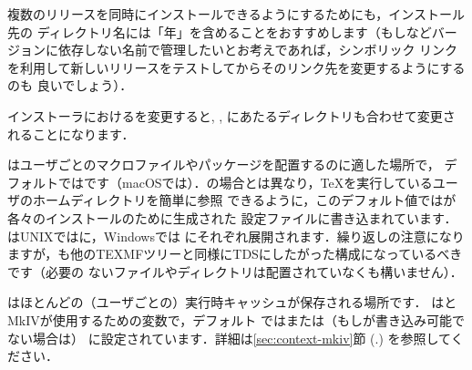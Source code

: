 \documentclass[uplatex,dvipdfmx]{jsarticle}
\begin{document}
複数の\TL リリースを同時にインストールできるようにするためにも，インストール先の
ディレクトリ名には「年」を含めることをおすすめします（もしなどバージョンに依存しない名前で管理したいとお考えであれば，シンボリック
リンクを利用して新しいリリースをテストしてからそのリンク先を変更するようにするのも
良いでしょう）．

インストーラにおけるを変更すると, ,
にあたるディレクトリも合わせて変更されることになります．

はユーザごとのマクロファイルやパッケージを配置するのに適した場所で，
デフォルトではです（macOSでは）．の場合とは異なり，\TeX を実行しているユーザのホームディレクトリを簡単に参照
できるように，このデフォルト値では\code{\tl}が各々のインストールのために生成された
設定ファイルに書き込まれています．\code{\tl}はUNIXではに，Windowsでは
にそれぞれ展開されます．繰り返しの注意になりますが，も他のTEXMFツリーと同様にTDSにしたがった構成になっているべきです（必要の
ないファイルやディレクトリは配置されていなくも構いません）．

はほとんどの（ユーザごとの）実行時キャッシュが保存される場所です．
は\LuaLaTeX と{\ConTeXt} MkIVが使用するための変数で，デフォルト
ではまたは（もしが書き込み可能でない場合は）
に設定されています．詳細は\ref{sec:context-mkiv}節 (\p.\pageref{%
sec:context-mkiv}) を参照してください．
\end{document}
